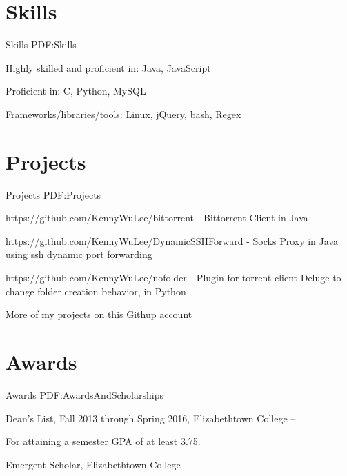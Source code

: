 \documentclass[letterpaper,MMMyyyy,nonstop]{simpleresumecv}
\begin{document}
\begin{body}
\bigskip


\section
{Skills}
{Skills}
{PDF:Skills}

\BulletItem
Highly skilled and proficient in: Java, JavaScript

\Gap
\BulletItem
Proficient in: C, Python, MySQL

\Gap
\BulletItem
Frameworks/libraries/tools: Linux, jQuery, bash, Regex


\bigskip


\section
{Projects}
{Projects}
{PDF:Projects}

\BulletItem
https://github.com/KennyWuLee/bittorrent - Bittorrent Client in Java

\Gap
\BulletItem
https://github.com/KennyWuLee/DynamicSSHForward - Socks Proxy in Java using ssh dynamic port forwarding

\Gap
\BulletItem
https://github.com/KennyWuLee/nofolder - Plugin for torrent-client Deluge to change folder creation behavior, in Python

\Gap
\BulletItem
More of my projects on this Githup account


\bigskip


\section
{Awards}
{Awards}
{PDF:AwardsAndScholarships}

\BulletItem
Dean's List,
Fall 2013 through Spring 2016,
Elizabethtown College
\hfill
{} --
\begin{detail}
\SubItem
For attaining a semester GPA of at least 3.75.
\end{detail}

\Gap
\BulletItem
Emergent Scholar,
Elizabethtown College
\hfill
{}

\end{body}
\end{document}
